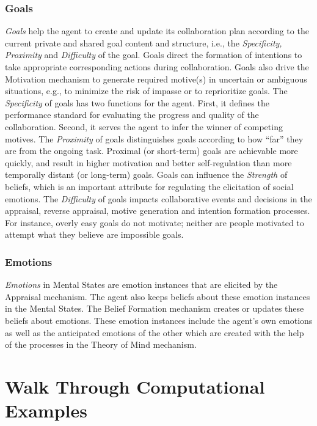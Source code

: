 \subsubsection{Goals}

\textit{Goals} help the agent to create and update its collaboration plan
according to the current private and shared goal content and structure, i.e.,
the \textit{Specificity, Proximity} and \textit{Difficulty} of the goal. Goals
direct the formation of intentions to take appropriate corresponding actions
during collaboration. Goals also drive the Motivation mechanism to generate
required motive(s) in uncertain or ambiguous situations, e.g., to minimize the
risk of impasse or to reprioritize goals. The \textit{Specificity} of goals has
two functions for the agent. First, it defines the performance standard for
evaluating the progress and quality of the collaboration. Second, it serves the
agent to infer the winner of competing motives. The \textit{Proximity} of goals
distinguishes goals according to how ``far'' they are from the ongoing task.
Proximal (or short-term) goals are achievable more quickly, and result in higher
motivation and better self-regulation than more temporally distant (or
long-term) goals. Goals can influence the \textit{Strength} of beliefs, which is
an important attribute for regulating the elicitation of social emotions. The
\textit{Difficulty} of goals impacts collaborative events and decisions in the
appraisal, reverse appraisal, motive generation and intention formation
processes. For instance, overly easy goals do not motivate; neither are people
motivated to attempt what they believe are impossible goals.

\subsubsection{Emotions}

\textit{Emotions} in Mental States are emotion instances that are elicited by
the Appraisal mechanism. The agent also keeps beliefs about these emotion
instances in the Mental States. The Belief Formation mechanism creates or
updates these beliefs about emotions. These emotion instances include the
agent's own emotions as well as the anticipated emotions of the other which are
created with the help of the processes in the Theory of Mind mechanism.

\section{Walk Through Computational Examples}

